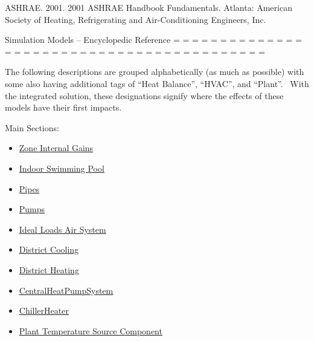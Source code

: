 ASHRAE. 2001. 2001 ASHRAE Handbook Fundamentals. Atlanta: American Society of Heating, Refrigerating and Air-Conditioning Engineers, Inc.

  Simulation Models -- Encyclopedic Reference = = = = = = = = = = = = = = = = = = = = = = = = = = = = = = = = = = = = = = = = = =

The following descriptions are grouped alphabetically (as much as possible) with some also having additional tags of ``Heat Balance'', ``HVAC'', and ``Plant''.~ With the integrated solution, these designations signify where the effects of these models have their first impacts.

Main Sections:

\begin{itemize}
\tightlist
\item
  \protect\hyperlink{ZoneGains}{Zone Internal Gains}
\item
  \protect\hyperlink{IndoorSwimmingPool}{Indoor Swimming Pool}
\item
  \protect\hyperlink{Pipes}{Pipes}
\item
  \protect\hyperlink{Pumps}{Pumps}
\item
  \protect\hyperlink{IdealLoads}{Ideal Loads Air System}
\item
  \protect\hyperlink{DistrictCooling}{District Cooling}
\item
  \protect\hyperlink{DistrictHeating}{District Heating}
\item
  \protect\hyperlink{CentralHeatPumpSystem}{CentralHeatPumpSystem}
\item
  \protect\hyperlink{ChillerHeater}{ChillerHeater}
\item
  \protect\hyperlink{PlantComponents}{Plant Temperature Source Component} 
\end{itemize}
